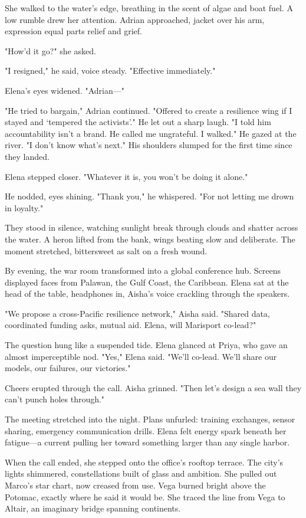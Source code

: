 She walked to the water's edge, breathing in the scent of algae and boat fuel. A low rumble drew her attention. Adrian approached, jacket over his arm, expression equal parts relief and grief.

"How'd it go?" she asked.

"I resigned," he said, voice steady. "Effective immediately."

Elena's eyes widened. "Adrian—"

"He tried to bargain," Adrian continued. "Offered to create a resilience wing if I stayed and `tempered the activists'." He let out a sharp laugh. "I told him accountability isn't a brand. He called me ungrateful. I walked." He gazed at the river. "I don't know what's next." His shoulders slumped for the first time since they landed.

Elena stepped closer. "Whatever it is, you won't be doing it alone."

He nodded, eyes shining. "Thank you," he whispered. "For not letting me drown in loyalty."

They stood in silence, watching sunlight break through clouds and shatter across the water. A heron lifted from the bank, wings beating slow and deliberate. The moment stretched, bittersweet as salt on a fresh wound.

By evening, the war room transformed into a global conference hub. Screens displayed faces from Palawan, the Gulf Coast, the Caribbean. Elena sat at the head of the table, headphones in, Aisha's voice crackling through the speakers.

"We propose a cross-Pacific resilience network," Aisha said. "Shared data, coordinated funding asks, mutual aid. Elena, will Marisport co-lead?"

The question hung like a suspended tide. Elena glanced at Priya, who gave an almost imperceptible nod. "Yes," Elena said. "We'll co-lead. We'll share our models, our failures, our victories."

Cheers erupted through the call. Aisha grinned. "Then let's design a sea wall they can't punch holes through."

The meeting stretched into the night. Plans unfurled: training exchanges, sensor sharing, emergency communication drills. Elena felt energy spark beneath her fatigue—a current pulling her toward something larger than any single harbor.

When the call ended, she stepped onto the office's rooftop terrace. The city's lights shimmered, constellations built of glass and ambition. She pulled out Marco's star chart, now creased from use. Vega burned bright above the Potomac, exactly where he said it would be. She traced the line from Vega to Altair, an imaginary bridge spanning continents.

